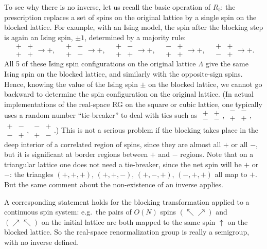 To see why there is no inverse, let us recall the basic operation of $R_b$: the prescription replaces a
set of spins on the original lattice by a single spin on the blocked lattice. For example, with an Ising
model, the spin after the blocking step is again an Ising spin, $\pm1$, determined by a majority rule:
\begin{equation*}
  \begin{array}{cc}+&+\\+&+\end{array}\to +,\quad
  \begin{array}{cc}+&+\\+&-\end{array}\to +,\quad
  \begin{array}{cc}+&-\\+&+\end{array}\to +,\quad
  \begin{array}{cc}-&+\\+&+\end{array}\to +,\quad
  \begin{array}{cc}+&+\\-&+\end{array}\to +.
\end{equation*}
All 5 of these Ising spin configurations on the original lattice $\Lambda$ give the same Ising spin on the
blocked lattice, and similarly with the opposite-sign spins. Hence, knowing the value of the Ising spin
$\pm$ on the blocked lattice, we cannot go backward to determine the spin configuration on the original
lattice. (In actual implementations of the real-space RG on the square or cubic lattice, one typically
uses a random number ``tie-breaker'' to deal with ties such as
$\begin{smallmatrix}+&+\\-&-\end{smallmatrix}$, $\begin{smallmatrix}-&-\\+&+\end{smallmatrix}$,
$\begin{smallmatrix}+&-\\-&+\end{smallmatrix}$, $\begin{smallmatrix}-&+\\+&-\end{smallmatrix}$.)
This is not a serious problem if the blocking takes place in the deep interior of a correlated region of
spins, since they are almost all $+$ or all $-$, but it is significant at border regions between $+$ and
$-$ regions. Note that on a triangular lattice one does not need a tie-breaker, since the net spin will
be $+$ or $-$: the triangles $(+,+,+)$, $(+,+,-)$, $(+,-,+)$, $(-,+,+)$ all map to $+$. But the same
comment about the non-existence of an inverse applies.

A corresponding statement holds for the blocking transformation applied to a continuous spin system: e.g.\
the pairs of $O(N)$ spins $(\nwarrow\nearrow)$ and $(\nearrow\nwarrow)$ on the initial lattice are both
mapped to the same spin $\uparrow$ on the blocked lattice. So the real-space renormalization group is
really a semigroup, with no inverse defined.
